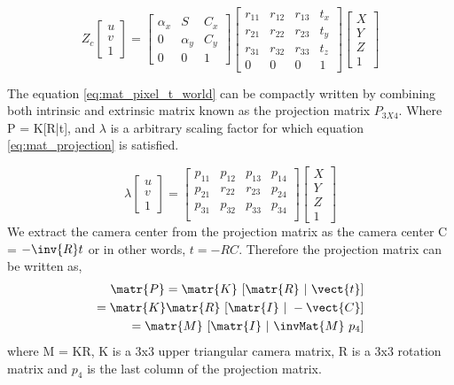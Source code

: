 \begin{equation}
Z_c \left[ 
\begin{array}{c} u\\ v\\ 1 \end{array} 
\right] = 
\begin{bmatrix}
\alpha_x & S & C_x \\
0 & \alpha_y & C_y \\
0 & 0 & 1
\end{bmatrix} 
\begin{bmatrix}
r_{11} &r_{12}  &r_{13}  &t_x\\
r_{21} &r_{22}  &r_{23}  &t_y\\
r_{31} &r_{32}  &r_{33}  &t_z \\
0 &0  &0  &1
\end{bmatrix}
\left[ 
\begin{array}{c} X\\ Y\\ Z\\ 1 \end{array} 
\right]
\label{eq:mat_pixel_t_world}
\end{equation}

The equation \ref{eq:mat_pixel_t_world} can be compactly written by combining both intrinsic and extrinsic matrix known as the projection matrix \textbf{$P_{3X4}$}. Where P = K[R|t], and $\lambda$ is a arbitrary scaling factor for which equation \ref{eq:mat_projection} is satisfied.

\begin{equation}
\lambda \left[ 
\begin{array}{c} u\\ v\\ 1 \end{array} 
\right] = 
\begin{bmatrix}
p_{11} &p_{12}  &p_{13}  &p_{14}\\
p_{21} &r_{22}  &r_{23}  &p_{24}\\
p_{31} &p_{32}  &p_{33}  &p_{34} \\
\end{bmatrix}
\left[ 
\begin{array}{c} X\\ Y\\ Z\\ 1 \end{array} 
\right]
\label{eq:mat_projection}
\end{equation} 
We extract the camera center from the projection matrix as the camera center C = $-\inv{R}t$ or in other words, $t = -RC$. Therefore the projection matrix can be written as,
\begin{equation}
\begin{split}
	\matr{P} = \matr{K}\ [\matr{R}\ |\ \vect{t}]\\
	  = \matr{K}\matr{R}\ [\matr{I}\ |\ -\vect{C}]\\
      = \matr{M}\ [\matr{I}\ |\ \invMat{M}\ \textbf{$p_4$}]
\end{split}
\label{eq:projection_split_up}
\end{equation}
where M = KR, K is a 3x3 upper triangular camera matrix, R is a 3x3 rotation matrix and $p_4$ is the last column of the projection matrix.

